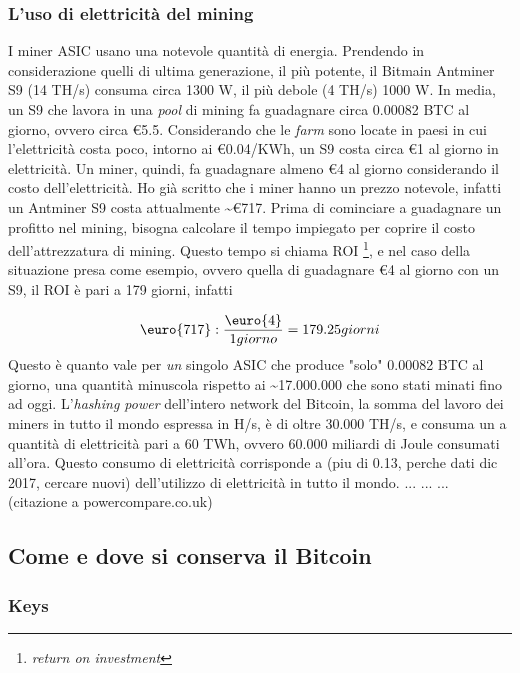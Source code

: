 \documentclass {article}
\begin{document}
\subsubsection {L'uso di elettricità del mining}


I miner ASIC usano una notevole quantità di energia. Prendendo in considerazione quelli di ultima generazione, il più potente, il Bitmain Antminer S9 (14 TH/s) consuma circa 1300 W, il più debole (4 TH/s) 1000 W.
In media, un S9 che lavora in una \textit{pool} di mining fa guadagnare circa 0.00082 BTC al giorno, ovvero circa \euro{5.5}.
Considerando che le \textit{farm} sono locate in paesi in cui l'elettricità costa poco, intorno ai \euro{0.04}/KWh, un S9 costa circa \euro{1} al giorno in elettricità.
Un miner, quindi, fa guadagnare almeno \euro{4} al giorno considerando il costo dell'elettricità.
Ho già scritto che i miner hanno un prezzo notevole, infatti un Antminer S9 costa attualmente \textasciitilde \euro{717}.
Prima di cominciare a guadagnare un profitto nel mining, bisogna calcolare il tempo impiegato per coprire il costo dell'attrezzatura di mining.
Questo tempo si chiama ROI \footnote{\textit{return on investment}}, e nel caso della situazione presa come esempio, ovvero quella di guadagnare \euro{4} al giorno con un S9, il ROI è pari a 179 giorni, infatti

$$\textup{\euro{717}} : \frac{\textup{\euro{4}}}{1 giorno} = 179.25 giorni$$
%
Questo è quanto vale per \emph{un} singolo ASIC che produce "solo" 0.00082 BTC al giorno, una quantità minuscola rispetto ai \textasciitilde 17.000.000 che sono stati minati fino ad oggi.
L'\textit{hashing power} dell'intero network del Bitcoin, la somma del lavoro dei miners in tutto il mondo espressa in H/s, è di oltre 30.000 TH/s, e consuma un a quantità di elettricità pari a 60 TWh, ovvero 60.000 miliardi di Joule consumati all'ora.
Questo consumo di elettricità corrisponde a (piu di 0.13, perche dati dic 2017, cercare nuovi) dell'utilizzo di elettricità in tutto il mondo.
... ... ... (citazione a powercompare.co.uk)


\subsection {Come e dove si conserva il Bitcoin}


\subsubsection {Keys}
\end{document}
